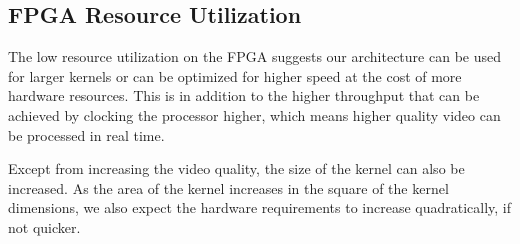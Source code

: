\subsection{FPGA Resource Utilization}
The low resource utilization on the FPGA suggests our architecture can be used for larger kernels or can be optimized for higher speed at the cost of more hardware resources.
This is in addition to the higher throughput that can be achieved by clocking the processor higher, which means higher quality video can be processed in real time.

Except from increasing the video quality, the size of the kernel can also be increased.
As the area of the kernel increases in the square of the kernel dimensions, we also expect the hardware requirements to increase quadratically, if not quicker.
